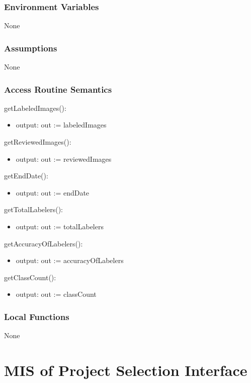\documentclass[12pt, titlepage]{article}
\begin{document}
\subsubsection{Environment Variables}
None

\subsubsection{Assumptions}
None

\subsubsection{Access Routine Semantics}

\noindent getLabeledImages():
\begin{itemize}
\item output: out := labeledImages
\end{itemize}

\noindent getReviewedImages():
\begin{itemize}
\item output: out := reviewedImages
\end{itemize}

\noindent getEndDate():
\begin{itemize}
\item output: out := endDate
\end{itemize}

\noindent getTotalLabelers():
\begin{itemize}
\item output: out := totalLabelers
\end{itemize}

\noindent getAccuracyOfLabelers():
\begin{itemize}
\item output: out := accuracyOfLabelers
\end{itemize}

\noindent getClassCount():
\begin{itemize}
\item output: out := classCount
\end{itemize}

\subsubsection{Local Functions}
None

\section{MIS of Project Selection Interface} \label{psi}
\end{document}
